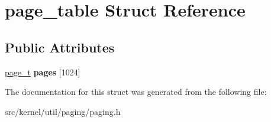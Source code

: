 \hypertarget{structpage__table}{}\section{page\+\_\+table Struct Reference}
\label{structpage__table}
\subsection*{Public Attributes}
\begin{DoxyCompactItemize}
\item 
\mbox{\label{structpage__table_a48867fe3c6d8599eff21b790260d55b4}} 
\hyperlink{structpage}{page\+\_\+t} {\bfseries pages} \mbox{[}1024\mbox{]}
\end{DoxyCompactItemize}


The documentation for this struct was generated from the following file\+:\begin{DoxyCompactItemize}
\item 
src/kernel/util/paging/paging.\+h\end{DoxyCompactItemize}
